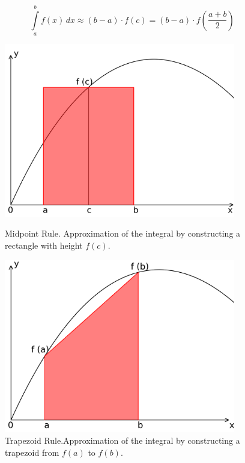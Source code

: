 \begin{equation}
\int\limits_{a}^{b} f(x)\, dx \approx (b - a) \cdot f(c) = (b - a) \cdot f\!\left(\frac{a + b}{2}\right)
 \label{eq:midpoint_rule}
\end{equation}



\begin{figure}[hb]
\centering
\begin{minipage}{.45\textwidth}
  \centering
	\includegraphics[width=0.9\textwidth]{graphics/midpoint.png}
	\caption{Midpoint Rule. Approximation of the integral by constructing a rectangle with height $f(c)$.}
	\label{fig:midpoint_rule}  
\end{minipage} \hspace{10px}
\begin{minipage}{.45\textwidth}
  \centering
  \includegraphics[width=0.9\textwidth]{graphics/trapezoid3}
	\caption{Trapezoid Rule.\newline Approximation of the integral by constructing a trapezoid from $f(a)$ to $f(b)$. }
	\label{fig:trapez_integration}
\end{minipage}
\end{figure}

